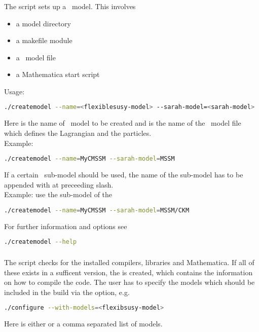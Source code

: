 \subsubsection{}
\label{sec:createmodel}

The  script sets up a \flexisusy\ model.  This involves
%
\begin{itemize}
\item a model directory 
\item a makefile module 
\item a \flexisusy\ model file 
\item a Mathematica start script 
\end{itemize}
%
Usage:
\begin{lstlisting}[language=bash]
./createmodel --name=<flexiblesusy-model> --sarah-model=<sarah-model>
\end{lstlisting}
Here  is the name of \flexisusy\ model
to be created and  is the name of the \sarah\
model file which defines the Lagrangian and the particles.\\
Example:
\begin{lstlisting}[language=bash]
./createmodel --name=MyCMSSM --sarah-model=MSSM
\end{lstlisting}
%
%
If a certain \sarah\ sub-model should be used, the name of the sub-model
has to be appended with at preceeding slash.\\
Example: use the  sub-model of the 
\begin{lstlisting}[language=bash]
./createmodel --name=MyCMSSM --sarah-model=MSSM/CKM
\end{lstlisting}
%
For further information and options see
\begin{lstlisting}[language=bash]
./createmodel --help
\end{lstlisting}

\subsubsection{}
\label{sec:configure}

The  script checks for the installed compilers,
libraries and Mathematica.  If all of these exists in a sufficent
version, the \code{Makefile} is created, which contains the information
on how to compile the code.  The user has to specify the models which
should be included in the build via the \code{--with-models=} option,
e.g.
%
\begin{lstlisting}[language=bash]
./configure --with-models=<flexibsusy-model>
\end{lstlisting}
%
Here  is either  or a comma
separated list of \flexisusy models.

